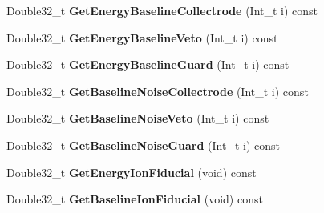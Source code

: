 \begin{DoxyCompactItemize}
\item 
\hypertarget{class_edw_h_l_a_single_bolo_sub_record_a31946fdb9bffa3f25ba6c2b53312c845}{
Double32\_\-t {\bfseries GetEnergyBaselineCollectrode} (Int\_\-t i) const }
\label{class_edw_h_l_a_single_bolo_sub_record_a31946fdb9bffa3f25ba6c2b53312c845}

\item 
\hypertarget{class_edw_h_l_a_single_bolo_sub_record_a320835000a18bff9913890b9163768ec}{
Double32\_\-t {\bfseries GetEnergyBaselineVeto} (Int\_\-t i) const }
\label{class_edw_h_l_a_single_bolo_sub_record_a320835000a18bff9913890b9163768ec}

\item 
\hypertarget{class_edw_h_l_a_single_bolo_sub_record_a96fc63ce37eb4fc7ad835b3ed05aeb2a}{
Double32\_\-t {\bfseries GetEnergyBaselineGuard} (Int\_\-t i) const }
\label{class_edw_h_l_a_single_bolo_sub_record_a96fc63ce37eb4fc7ad835b3ed05aeb2a}

\item 
\hypertarget{class_edw_h_l_a_single_bolo_sub_record_aed68a5e1c7e037bacc1cb4a9615ad047}{
Double32\_\-t {\bfseries GetBaselineNoiseCollectrode} (Int\_\-t i) const }
\label{class_edw_h_l_a_single_bolo_sub_record_aed68a5e1c7e037bacc1cb4a9615ad047}

\item 
\hypertarget{class_edw_h_l_a_single_bolo_sub_record_ac1b19a4836d3b57538ff45d1a226c234}{
Double32\_\-t {\bfseries GetBaselineNoiseVeto} (Int\_\-t i) const }
\label{class_edw_h_l_a_single_bolo_sub_record_ac1b19a4836d3b57538ff45d1a226c234}

\item 
\hypertarget{class_edw_h_l_a_single_bolo_sub_record_ae27f75611a9392170208cdf55006d338}{
Double32\_\-t {\bfseries GetBaselineNoiseGuard} (Int\_\-t i) const }
\label{class_edw_h_l_a_single_bolo_sub_record_ae27f75611a9392170208cdf55006d338}

\item 
\hypertarget{class_edw_h_l_a_single_bolo_sub_record_a5eb4d6c7050c9adfdf926a6eb8724c28}{
Double32\_\-t {\bfseries GetEnergyIonFiducial} (void) const }
\label{class_edw_h_l_a_single_bolo_sub_record_a5eb4d6c7050c9adfdf926a6eb8724c28}

\item 
\hypertarget{class_edw_h_l_a_single_bolo_sub_record_af4db9fa219882b0644718bb85bbcad1c}{
Double32\_\-t {\bfseries GetBaselineIonFiducial} (void) const }
\label{class_edw_h_l_a_single_bolo_sub_record_af4db9fa219882b0644718bb85bbcad1c}


\end{DoxyCompactItemize}

